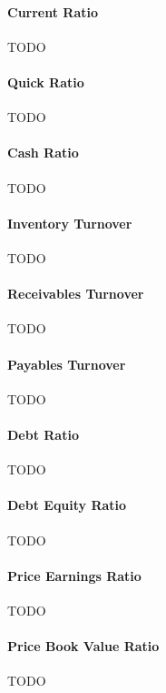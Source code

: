 \documentclass[../xlapes02]{subfiles}
\begin{document}
    \paragraph{Current Ratio}\label{par:current-ratio}
    TODO

    \paragraph{Quick Ratio}\label{par:quick-ratio}
    TODO

    \paragraph{Cash Ratio}\label{par:cash-ratio}
    TODO

    \paragraph{Inventory Turnover}\label{par:inventory-turnover}
    TODO

    \paragraph{Receivables Turnover}\label{par:receivables-turnover}
    TODO

    \paragraph{Payables Turnover}\label{par:payables-turnover}
    TODO

    \paragraph{Debt Ratio}\label{par:debt-ratio}
    TODO

    \paragraph{Debt Equity Ratio}\label{par:debt-equity-ratio}
    TODO

    \paragraph{Price Earnings Ratio}\label{par:price-earnings-ratio}
    TODO

    \paragraph{Price Book Value Ratio}\label{par:price-book-value-ratio}
    TODO
\end{document}
